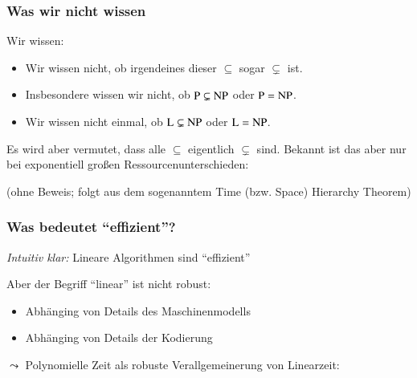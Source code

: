 \documentclass[aspectratio=1610,onlymath]{beamer}
\begin{document}
\begin{frame}\frametitle{Was wir nicht wissen}

Wir wissen:

\theobox{
\[\Scomplclass{L}\subseteq\Scomplclass{NL}\subseteq \Scomplclass{P}\subseteq\Scomplclass{NP}\subseteq\Scomplclass{PSpace}= \Scomplclass{NPSpace}\subseteq \Scomplclass{Exp}\subseteq \Scomplclass{NExp}\]
\vspace{-2.5ex}
}

\begin{itemize}
\item Wir wissen nicht, ob irgendeines dieser $\subseteq$ sogar $\subsetneq$ ist.
\item Insbesondere wissen wir nicht, ob ${\textsc{P}}\subsetneq{\textsc{NP}}$ oder ${\textsc{P}}={\textsc{NP}}$.
\item Wir wissen nicht einmal, ob ${\textsc{L}}\subsetneq{\textsc{NP}}$ oder ${\textsc{L}}={\textsc{NP}}$.
\end{itemize}\pause
Es wird aber vermutet, dass alle  $\subseteq$ eigentlich $\subsetneq$ sind.
% 
Bekannt ist das aber nur bei exponentiell großen Ressourcenunterschieden:


(ohne Beweis; folgt aus dem sogenanntem \alert{Time (bzw. Space) Hierarchy Theorem})

\end{frame}



\begin{frame}\frametitle{Was bedeutet "`effizient"'?}

\emph{Intuitiv klar:} Lineare Algorithmen sind "`effizient"'
\bigskip\pause

Aber der Begriff "`linear"' ist nicht robust:
\begin{itemize}
\item Abhänging von Details des Maschinenmodells
\item Abhänging von Details der Kodierung
\end{itemize}
\bigskip
$\leadsto$ Polynomielle Zeit als robuste Verallgemeinerung von Linearzeit:\bigskip

%

\end{frame}
\end{document}

